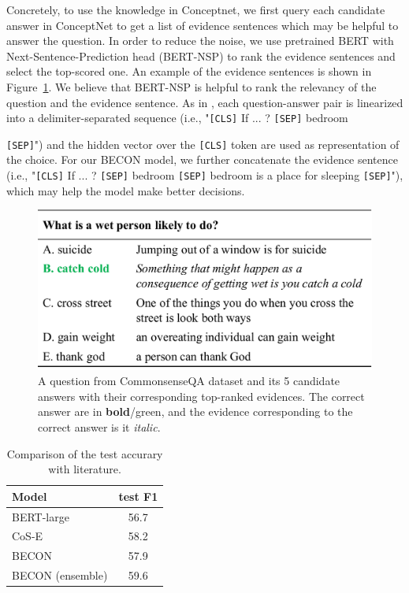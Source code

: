 \documentclass[11pt,a4paper]{article}
\begin{document}
Concretely, to use the knowledge in Conceptnet, we first query each candidate answer in ConceptNet to get a list of evidence sentences which may be helpful to answer the question. In order to reduce the noise, we use pretrained BERT with Next-Sentence-Prediction head (BERT-NSP) to rank the evidence sentences and select the top-scored one. An example of the evidence sentences is shown in Figure~\ref{figure:introdemo}. We believe that BERT-NSP is helpful to rank the relevancy of the question and the evidence sentence. As in \cite{talmor2018commonsenseqa}, each question-answer pair is linearized into a delimiter-separated sequence (i.e., "{\tt[CLS]} If ... ? {\tt [SEP]} bedroom {{\tt [SEP]}") and the hidden vector over the {\tt [CLS]} token are used as representation of the choice. For our BECON model, we further concatenate the evidence sentence (i.e., "{\tt [CLS]} If ... ? {\tt [SEP]} bedroom {\tt [SEP]} bedroom is a place for sleeping {\tt [SEP]}"), which may help the model make better decisions.

\begin{figure}[t]
    \centering
    \includegraphics[width=\columnwidth]{figure}
    \caption{A question from CommonsenseQA dataset and its 5 candidate answers with their corresponding top-ranked evidences. The correct answer are in {\bf bold}/green, and the evidence corresponding to the correct answer is it {\it italic}.}
    \label{figure:introdemo}
\end{figure}

\begin{table}[t]
    \centering
    \small
    \begin{tabular}{l c}
    \hline
    {\bf Model}  & {\bf test F1 } \\
    \hline\hline
    BERT-large~\cite{talmor2018commonsenseqa} & 56.7  \\
    \hline
    CoS-E~\cite{rajani2019explain} & 58.2  \\
    \hline
    BECON  & 57.9 \\
    BECON (ensemble)    & 59.6 \\
    \hline
    \end{tabular}
    \caption{Comparison of the test accurary with literature.}
    \label{table:result}
\end{table}
    
}
\end{document}
